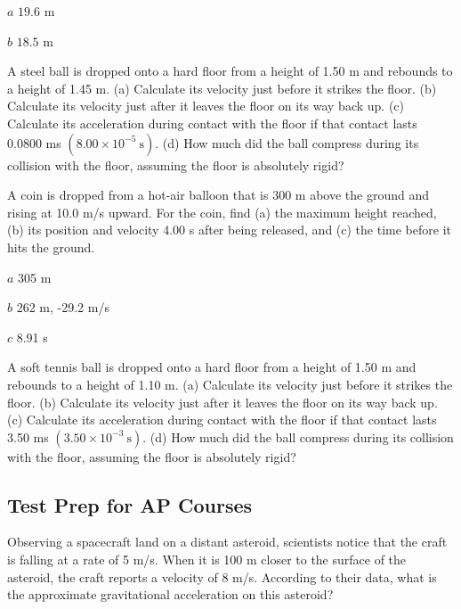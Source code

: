 \documentclass[
]{book}
\begin{document}
\leavevmode{}%
\(a\) \({\text{19}\text{.}\text{6\ m}}{}\)

\(b\) \({\text{18}\text{.}\text{5\ m}}{}\)

\hypertarget{fs-id2561073}{}
\leavevmode{}%
A steel ball is dropped onto a hard floor from a height of 1.50 m and
rebounds to a height of 1.45 m. (a) Calculate its velocity just before
it strikes the floor. (b) Calculate its velocity just after it leaves
the floor on its way back up. (c) Calculate its acceleration during
contact with the floor if that contact lasts 0.0800 ms
\({(8\text{.}{\text{00} \times \text{10}^{- 5}}\ \text{s})}{}\). (d) How
much did the ball compress during its collision with the floor, assuming
the floor is absolutely rigid?

\hypertarget{fs-id2227967}{}
\leavevmode{}%
A coin is dropped from a hot-air balloon that is 300 m above the ground
and rising at 10.0 m/s upward. For the coin, find (a) the maximum height
reached, (b) its position and velocity 4.00 s after being released, and
(c) the time before it hits the ground.

\leavevmode{}%
\(a\) 305 m

\(b\) 262 m, -29.2 m/s

\(c\) 8.91 s

\hypertarget{fs-id3597625}{}
\leavevmode{}%
A soft tennis ball is dropped onto a hard floor from a height of 1.50 m
and rebounds to a height of 1.10 m. (a) Calculate its velocity just
before it strikes the floor. (b) Calculate its velocity just after it
leaves the floor on its way back up. (c) Calculate its acceleration
during contact with the floor if that contact lasts 3.50 ms
\({(3\text{.}{\text{50} \times \text{10}^{- 3}}\ \text{s})}{}\). (d) How
much did the ball compress during its collision with the floor, assuming
the floor is absolutely rigid?

\hypertarget{fs-id2378715}{}
\hypertarget{test-prep-for-ap-courses-5}{%
\subsection{Test Prep for AP Courses}\label{test-prep-for-ap-courses-5}}

\hypertarget{fs-id2378722}{}
\leavevmode{}%
Observing a spacecraft land on a distant asteroid, scientists notice
that the craft is falling at a rate of 5 m/s. When it is 100 m closer to
the surface of the asteroid, the craft reports a velocity of 8 m/s.
According to their data, what is the approximate gravitational
acceleration on this asteroid?
\end{document}
